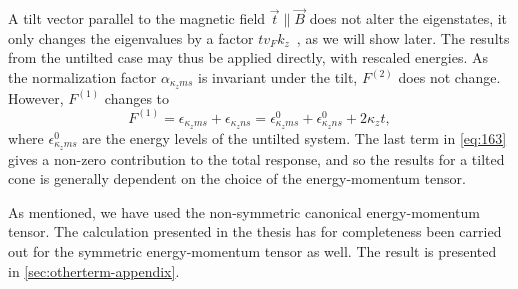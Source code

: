A tilt vector parallel to the magnetic field \( \vec{t} \parallel \vec{B} \) does not alter the eigenstates, it only changes the eigenvalues by a factor \( t v_F k_z \)~\cites{yuPredictedUnusualMagnetoresponse2016,tchoumakovMagneticFieldInducedRelativisticProperties2016}, as we will show later.
The results from the untilted case may thus be applied directly, with rescaled energies.
As the normalization factor \( \alpha_{\kappa_z m s} \) is invariant under the tilt, \( F^{(2)} \) does not change.
However, \( F^{(1)} \) changes to
\begin{equation}
  \label{eq:163}
  F^{(1)} = \epsilon_{\kappa_z m s} + \epsilon_{\kappa_z n s} = \epsilon^0_{\kappa_z m s} + \epsilon^0_{\kappa_z n s} + 2 \kappa_z t,
\end{equation}
where \( \epsilon^0_{\kappa_z m s} \) are the energy levels of the untilted system.
The last term in \cref{eq:163} gives a non-zero contribution to the total response, and so the results for a tilted cone is generally dependent on the choice of the energy-momentum tensor.

As mentioned, we have used the non-symmetric canonical energy-momentum tensor.
The calculation presented in the thesis has for completeness been carried out for the symmetric energy-momentum tensor as well.
The result is presented in \cref{sec:otherterm-appendix}.
